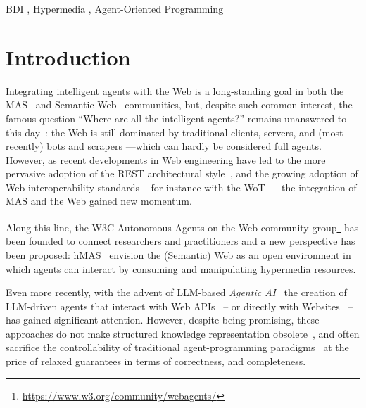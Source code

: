 \documentclass[
]{ceurart}
\begin{document}
\begin{keywords}
  BDI  \sep 
  Hypermedia \sep 
  Agent-Oriented Programming
\end{keywords}

\maketitle

\section{Introduction}

Integrating intelligent agents with the Web is a long-standing goal
in both the \ac{MAS}~\cite{DBLP:conf/edoc/ShafiqDF06}
and Semantic Web~\cite{lassila2001semantic} communities, but,
despite such common interest, 
the famous question 
``Where are all the intelligent agents?''
remains unanswered to this day~\cite{hendlerb2007expert}:
the Web is still dominated by traditional clients, servers, 
and (most recently) bots and scrapers%
---which can hardly be considered full agents.
%
However,
as recent developments in Web engineering have led to 
the more pervasive adoption of the \ac{REST} architectural style~\cite{DBLP:journals/toit/FieldingT02},
and the growing adoption of Web interoperability standards %
-- for instance with the \ac{WoT}~\cite{wotarch} --
the integration of \ac{MAS} and the Web gained new momentum.

Along this line, 
the \ac{W3C} Autonomous Agents on the Web community group\footnote{\url{https://www.w3.org/community/webagents/}}
has been founded to connect researchers and practitioners
and a new perspective has been proposed: \ac{hMAS}~\cite{DBLP:conf/atal/CiorteaMGBRZ19}
envision the (Semantic) Web as an open environment in which
agents can interact by consuming and manipulating hypermedia resources.

Even more recently, 
with the advent of \ac{LLM}-based \emph{Agentic AI}~\cite{acharya2025access} 
the creation of \ac{LLM}-driven agents that interact with Web APIs~\missingref{}
-- or directly with Websites~\cite{10.5555/3692070.3694608} --
has gained significant attention.
%
However,
despite being promising,
these approaches
do not make structured knowledge representation obsolete~\cite{pan2024tkde}, 
and often sacrifice the controllability of traditional agent-programming paradigms~\missingref{}
at the price of relaxed guarantees in terms of correctness, and completeness.
\end{document}
